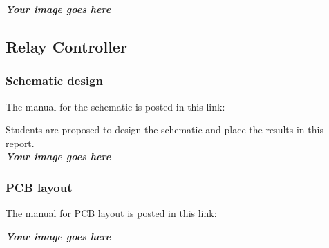 \begin{center}
\end{center}

\textbf{\textit{Your image goes here}}

\subsection{Relay Controller}

\subsubsection{Schematic design}
The manual for the schematic is posted in this link:

\begin{center}
\end{center}

Students are proposed to design the schematic and place the results in this report.\\

\textbf{\textit{Your image goes here}}

\subsubsection{PCB layout}
The manual for PCB layout is posted in this link:\\

\begin{center}
\end{center}

\textbf{\textit{Your image goes here}}